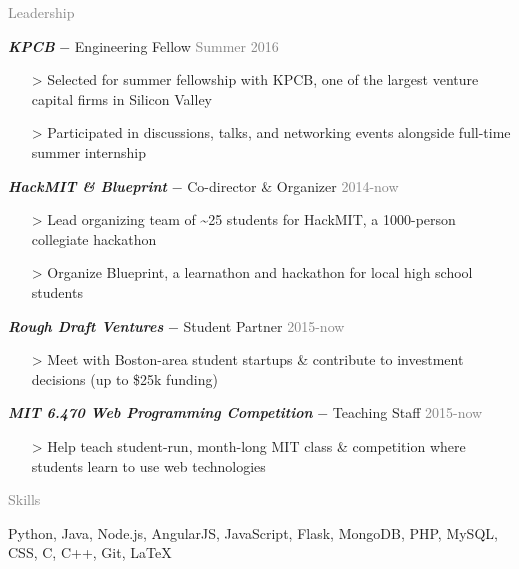 \documentclass[11pt]{article}
\newcommand{\rsection}[1]{\vspace{1.5em}\textcolor{gray}{\Large \robotoslab #1}\vspace{0.5em}}
\newcommand{\bt}[1]{\textit{\textbf{#1}}} %
\newcommand{\gap}[0]{\vspace{0.5em}} %
\newcommand{\dash}[0]{ $-$ } %
\newcommand{\gray}[1]{\textcolor{gray}{#1}}
\newcommand{\e}[0]{> }
\begin{document}
\rsection{Leadership}

\bt{KPCB}\dash Engineering Fellow \hfill \gray{Summer 2016}

\begin{itemize}
\item[\e] Selected for summer fellowship with KPCB, one of the largest venture capital firms in Silicon Valley
\item[\e] Participated in discussions, talks, and networking events alongside full-time summer internship
\end{itemize}

\gap

\bt{HackMIT \& Blueprint}\dash Co-director \& Organizer \hfill \gray{2014-now}

\begin{itemize}
\item[\e] Lead organizing team of \textasciitilde 25 students for HackMIT, a 1000-person collegiate hackathon
\item[\e] Organize Blueprint, a learnathon and hackathon for local high school students
\end{itemize}

\gap

\bt{Rough Draft Ventures}\dash Student Partner \hfill \gray{2015-now}

\begin{itemize}
\item[\e] Meet with Boston-area student startups \& contribute to investment decisions (up to \$25k funding)
\end{itemize}

\gap

\bt{MIT 6.470 Web Programming Competition}\dash Teaching Staff \hfill \gray{2015-now}

\begin{itemize}
\item[\e] Help teach student-run, month-long MIT class \& competition where students learn to use web technologies
\end{itemize}

\rsection{Skills}

Python, Java, Node.js, AngularJS, JavaScript, Flask, MongoDB, PHP, MySQL, CSS, C, C++, Git, {\selectfont\LaTeX}
\end{document}
